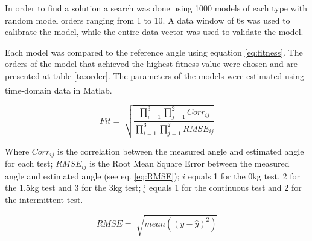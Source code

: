 \documentclass[letterpaper, 10 pt, conference]{ieeeconf}  %
\begin{document}
In order to find a solution a search was done using 1000 models of each type with random model orders ranging from 1 to 10. A data window of 6s was used to calibrate the model, while the entire data vector was used to validate the model.

Each model was compared to the reference angle using equation \ref{eq:fitness}. The orders of the model that achieved the highest fitness value were chosen and are presented at table \ref{ta:order}. The parameters of the models were estimated using time-domain data in Matlab\textsuperscript{\textregistered}.


\begin{equation}
\label{eq:fitness}
Fit = \sqrt[]{\frac{\prod_{i=1}^{3}\prod_{j=1}^{2} Corr_{ij}}{\prod_{i=1}^{3}\prod_{j=1}^{2} RMSE_{ij}}}
\end{equation}

% 
% 

% 
% 


Where $Corr_{ij}$ is the correlation between the measured angle and estimated angle for each test; $RMSE_{ij}$ is the Root Mean Square Error between the measured angle and estimated angle (see eq. \ref{eq:RMSE}); $i$ equals 1 for the 0kg test, 2 for the 1.5kg test and 3 for the 3kg test; j equals 1 for the continuous test and 2 for the intermittent test.

\begin{equation}
\label{eq:RMSE}
RMSE = \sqrt[]{mean((y-\hat{y})^2)}
\end{equation}

\end{document}
